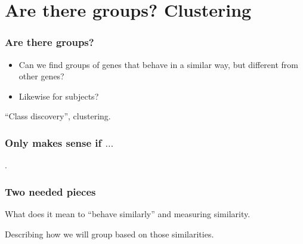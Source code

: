 \section[Clustering]{Are there groups? Clustering}





\begin{frame}
\frametitle{Are there groups?}
\begin{itemize}
\item Can we find groups of genes that behave in a similar way, but
  different from other genes?
\item Likewise for subjects?
\end{itemize}

``Class discovery'', clustering.


\end{frame}


\begin{frame}
\frametitle{Only makes sense if $\ldots$}
.

\end{frame}




\begin{frame}
\frametitle{Two needed pieces}

What does it mean to ``behave similarly'' and measuring similarity.
\vspace*{20pt}

Describing how we will group based on those similarities.

\end{frame}




